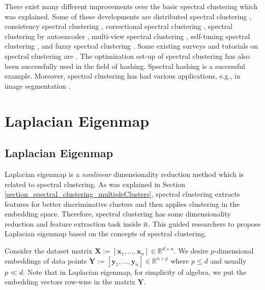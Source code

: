 \documentclass[lang=cn,10pt]{gorgeousnbook}
\numberwithin{equation}{section}%
\numberwithin{figure}{section}%
\begin{document}
There exist many different improvements over the basic spectral clustering which was explained. Some of these developments are distributed spectral clustering \cite{chen2010parallel}, consistency spectral clustering \cite{von2008consistency}, correctional spectral clustering \cite{blaschko2008correlational}, spectral clustering by autoencoder \cite{banijamali2017fast}, multi-view spectral clustering \cite{kumar2011co,kumar2011co2,yin2019multi}, self-tuning spectral clustering \cite{zelnik2004self}, and fuzzy spectral clustering \cite{yang2016fuzzy}. 
Some existing surveys and tutorials on spectral clustering are  \cite{von2007tutorial,guan2008survey,nascimento2011spectral,guo2012survey}. The optimization set-up of spectral clustering has also been successfully used in the field of hashing. Spectral hashing \cite{weiss2008spectral} is a successful example. 
Moreover, spectral clustering has had various applications, e.g., in image segmentation \cite{yang2016novel}.



\section{Laplacian Eigenmap}\label{section_Laplacian_eigenmap}

\subsection{Laplacian Eigenmap}

Laplacian eigenmap \cite{belkin2001laplacian,belkin2003laplacian} is a \textit{nonlinear} dimensionality reduction method which is related to spectral clustering. 
As was explained in Section \ref{section_spectral_clustering_multipleClusters}, spectral clustering extracts features for better discriminative clusters and then applies clustering in the embedding space. Therefore, spectral clustering has some dimensionality reduction and feature extraction task inside it. This guided researchers to propose Laplacian eigenmap based on the concepts of spectral clustering. 

Consider the dataset matrix $\boldsymbol{X} := [\boldsymbol{x}_1, \dots, \boldsymbol{x}_n] \in \mathbb{R}^{d \times n}$. We desire $p$-dimensional embeddings of data points $\boldsymbol{Y} := [\boldsymbol{y}_1, \dots, \boldsymbol{y}_n] \in \mathbb{R}^{n \times p}$ where $p \leq d$ and usually $p \ll d$. Note that in Laplacian eigenmap, for simplicity of algebra, we put the embedding vectors row-wise in the matrix $\boldsymbol{Y}$. 
\end{document}
